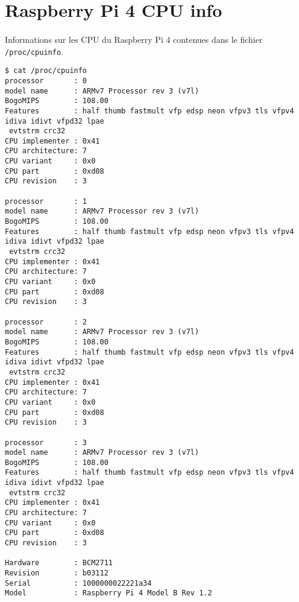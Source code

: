 \documentclass{article}
\begin{document}
\renewcommand{\contentsname}{Liste des annexes}
\tableofcontents

\newpage
\setcounter{page}{1}
\renewcommand{\thesection}{\Alph{section}}

\section{Raspberry Pi 4 CPU info}\label{app:cpuinfo}
\paragraph{}
Informations sur les CPU du Raspberry Pi 4 contenues dans le fichier \texttt{/proc/cpuinfo}.
\lstset{language=bash}
\begin{lstlisting}
$ cat /proc/cpuinfo
processor       : 0
model name      : ARMv7 Processor rev 3 (v7l)
BogoMIPS        : 108.00
Features        : half thumb fastmult vfp edsp neon vfpv3 tls vfpv4 idiva idivt vfpd32 lpae
 evtstrm crc32 
CPU implementer : 0x41
CPU architecture: 7
CPU variant     : 0x0
CPU part        : 0xd08
CPU revision    : 3

processor       : 1
model name      : ARMv7 Processor rev 3 (v7l)
BogoMIPS        : 108.00
Features        : half thumb fastmult vfp edsp neon vfpv3 tls vfpv4 idiva idivt vfpd32 lpae
 evtstrm crc32 
CPU implementer : 0x41
CPU architecture: 7
CPU variant     : 0x0
CPU part        : 0xd08
CPU revision    : 3

processor       : 2
model name      : ARMv7 Processor rev 3 (v7l)
BogoMIPS        : 108.00
Features        : half thumb fastmult vfp edsp neon vfpv3 tls vfpv4 idiva idivt vfpd32 lpae
 evtstrm crc32 
CPU implementer : 0x41
CPU architecture: 7
CPU variant     : 0x0
CPU part        : 0xd08
CPU revision    : 3

processor       : 3
model name      : ARMv7 Processor rev 3 (v7l)
BogoMIPS        : 108.00
Features        : half thumb fastmult vfp edsp neon vfpv3 tls vfpv4 idiva idivt vfpd32 lpae
 evtstrm crc32 
CPU implementer : 0x41
CPU architecture: 7
CPU variant     : 0x0
CPU part        : 0xd08
CPU revision    : 3

Hardware        : BCM2711
Revision        : b03112
Serial          : 1000000022221a34
Model           : Raspberry Pi 4 Model B Rev 1.2
\end{lstlisting}



\newpage
\end{document}
